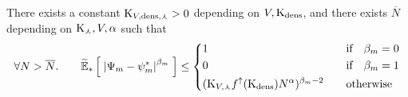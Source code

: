 	\begin{claim}\label{ch5:proof-of-LLN1:claim:bound-on-Psi-psi}
		There exists a constant $\text{K}_{V,\text{dens}, \curlywedge}>0$ depending on $V,\text{K}_{\text{dens}}$,  and there exists $\overline{N}$ depending on $\text{K}_\curlywedge,V, \alpha$ such that
		\begin{equation}
			\forall N > \overline{N}.\qquad
			\widetilde{\mathbb{E}}_{\ast} \left[ \; 
				\left| 
					\Psi_m - \psi_m^\ast 
				 \right|^{\beta_m}
			 \; \right]
			\leq 
			\left\{
			\begin{aligned}
				& 1		&&\text{if} \quad \beta_m = 0
				\\
				& 0 		&&\text{if} \quad \beta_m = 1
				\\
				&(\text{K}_{V, \curlywedge} 
				f^\uparrow(\text{K}_{\text{dens}})
				N^\alpha)^{\beta_m -2}	\quad		&&\text{otherwise}
			\end{aligned}
			\right.
		\end{equation}
	\end{claim}
	
